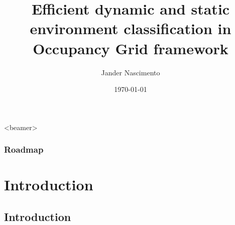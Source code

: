 \documentclass{beamer}
\title[Fast classification]{Efficient dynamic and static environment classification in Occupancy Grid framework}
\author{Jander Nascimento}
\institute{Université Joseph Fourier / INRIA}
\date{\today}
\begin{document}
\begin{frame}
\titlepage
\end{frame}

{
  \begin{frame}<beamer>
    \frametitle{Roadmap}
    \tableofcontents%
  \end{frame}
}

	\section{Introduction}
	
\subsection*{Introduction}	
\end{document}
